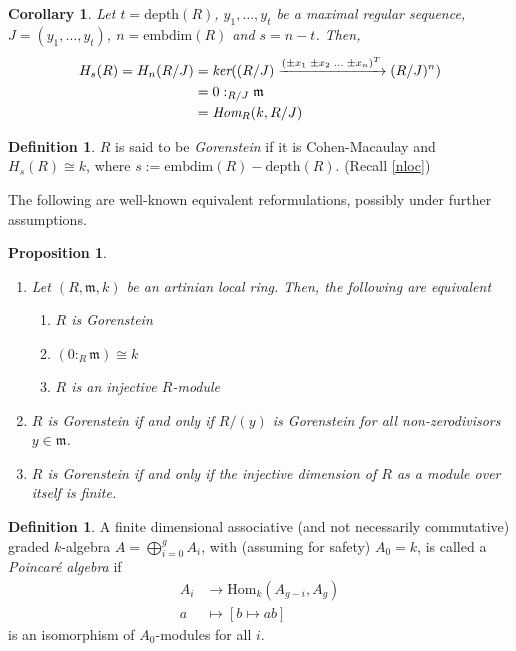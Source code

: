 \documentclass[oneside,11pt,reqno]{amsart}
\newtheorem{prop}[thm]{Proposition}
\newtheorem{cor}[thm]{Corollary}
\theoremstyle{definition}
\newtheorem{defn}[thm]{Definition}
\theoremstyle{remark}
\begin{document}
\begin{cor}
 Let $t=\text{depth}(R)$, $y_{1},\ldots ,y_{t}$ be a maximal regular sequence, $J=(y_{1},\ldots ,y_{t})$, $n=\text{embdim}(R)$ and $s=n-t$. Then,  
 \begin{align*}
	 H_{s}(R) = H_{n}(R/J) &= \emph{ker}((R/J) \xrightarrow{(\pm x_{1}\;\pm x_{2}\;\ldots \;\pm x_{n})^{T}} (R/J)^{n}) \\
	 &= 0:_{R/J} \mathfrak{m} \\
	 &=\emph{Hom}_{R}(k,R/J) 
 \end{align*}
\end{cor}


\begin{defn}
	$R$ is said to be \emph{Gorenstein} if it is Cohen-Macaulay and $H_{s}(R)\cong k$, where $s:=\text{embdim}(R)-\text{depth}(R)$. (Recall \cref{nloc})  
\end{defn}


The following are well-known equivalent reformulations, possibly under further assumptions.
\begin{prop}~
 \begin{enumerate}[label={\emph{(\arabic*)}}]
 \item Let $(R,\mathfrak{m},k)$ be an artinian local ring. Then, the following are equivalent
	 \begin{enumerate}[label={\emph{(\alph*)}}]
	  \item $R$ is Gorenstein
	 \item $(0:_{R} \mathfrak{m} ) \cong k$ 
	 \item $R$ is an injective $R$-module 
	 \end{enumerate}
 \item $R$ is Gorenstein if and only if $R/(y)$ is Gorenstein for all non-zerodivisors $y\in \mathfrak{m} $. 
 \item $R$ is Gorenstein if and only if the injective dimension of $R$ as a module over itself is finite.
 \end{enumerate}
 
\end{prop}


\begin{defn}
	A finite dimensional associative (and not necessarily commutative) graded $k$-algebra $A=\bigoplus _{i=0}^{g} A_{i}$, with (assuming for safety) $A_{0}=k$, is called a \emph{Poincar\'{e} algebra} if 
\begin{align*}
	A_{i} &\rightarrow \text{Hom}_{k}(A_{g-i},A_{g}) \\
	a &\mapsto [b\mapsto ab]
\end{align*}
 is an isomorphism of $A_{0}$-modules for all $i$.   
\end{defn}
\end{document}
